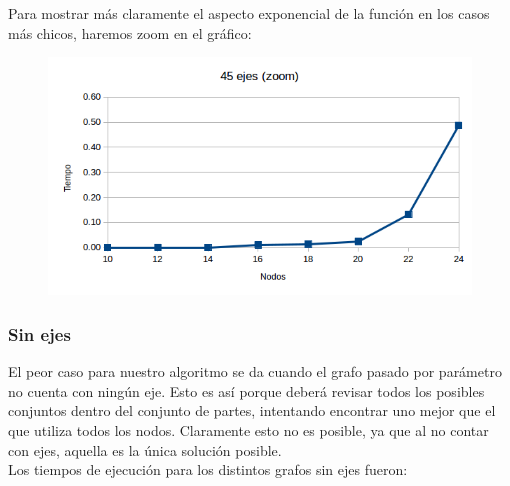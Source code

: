 Para mostrar m\'as claramente el aspecto exponencial de la funci\'on en los casos m\'as chicos, haremos zoom en el gr\'afico:\\

\begin{figure}[h!]
   \begin{center}
 	\includegraphics[scale=0.7]{imagenes/exacto/45Ejes(zoom).png}
   \end{center}
 \end{figure}

\subsubsection{Sin ejes}
El peor caso para nuestro algoritmo se da cuando el grafo pasado por par\'ametro no cuenta con ning\'un eje. Esto es as\'i porque deber\'a revisar todos los posibles conjuntos dentro del conjunto de partes,
intentando encontrar uno mejor que el que utiliza todos los nodos. Claramente esto no es posible, ya que al no contar con ejes, aquella es la \'unica soluci\'on posible.\\

\newpage
Los tiempos de ejecuci\'on para los distintos grafos sin ejes fueron:\\

